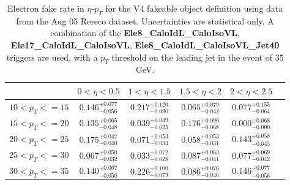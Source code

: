 \begin{table}[!htbp]
\begin{center}
\begin{tabular}{|c|c|c|c|c|c|}

\hline
                       &        $0<\eta<0.5$              &        $1<\eta<1.5$              &        $1.5<\eta<2$              &        $2<\eta<2.5$               \\
\hline
   $10 < p_{T} <= 15$ &        $0.146^{+0.077}_{-0.056}$ &        $0.217^{+0.120}_{-0.090}$ &        $0.065^{+0.079}_{-0.042}$ &        $0.077^{+0.155}_{-0.064}$  \\ 
 \hline
    $15 < p_{T} <= 20$ &        $0.135^{+0.065}_{-0.048}$ &        $0.039^{+0.049}_{-0.025}$ &        $0.176^{+0.090}_{-0.068}$ &        $0.000^{+0.068}_{-0.000}$  \\ 
 \hline
    $20 < p_{T} <= 25$ &        $0.175^{+0.047}_{-0.040}$ &        $0.071^{+0.053}_{-0.034}$ &        $0.058^{+0.053}_{-0.031}$ &        $0.143^{+0.058}_{-0.045}$  \\ 
 \hline
    $25 < p_{T} <= 30$ &        $0.067^{+0.050}_{-0.032}$ &        $0.033^{+0.072}_{-0.028}$ &        $0.087^{+0.063}_{-0.041}$ &        $0.077^{+0.069}_{-0.042}$  \\ 
 \hline
    $30 < p_{T} <= 35$ &        $0.140^{+0.067}_{-0.050}$ &        $0.226^{+0.100}_{-0.079}$ &        $0.086^{+0.076}_{-0.046}$ &        $0.146^{+0.077}_{-0.056}$  \\ 
 \hline

\end{tabular}
\caption{Electron fake rate in $\eta$-$p_T$ for the V4 fakeable object definition using data from the Aug 05 Rereco dataset. 
Uncertainties are statistical only. A combination of the {\bf Ele8\_CaloIdL\_CaloIsoVL}, {\bf Ele17\_CaloIdL\_CaloIsoVL}, 
{\bf Ele8\_CaloIdL\_CaloIsoVL\_Jet40} triggers are used, with a $p_{T}$ threshold on the leading jet in
the event of $35$ GeV. }
\label{tab:ele_fr_V4_jet35_a05}
\end{center}
\end{table}

